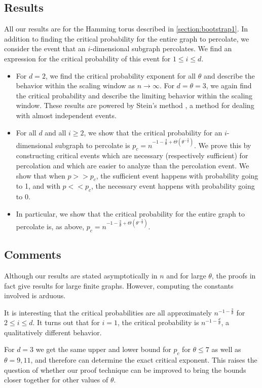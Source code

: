 \subsection{Results}
All our results are for the Hamming torus described in \ref{section:bootstrap1}. 
In addition to finding the critical probability for the entire graph to percolate, we consider the event that an $i$-dimensional subgraph percolates.
We find an expression for the critical probability of this event for $1 \le i \le d$.
\begin{itemize}
\item For $d=2$, we find the critical probability exponent for all $\theta$ and describe the behavior within the scaling window as $n \to \infty$.
For $d=\theta = 3$, we again find the critical probability and describe the limiting behavior within the scaling window.
These results are powered by Stein's method \cite{poissonbook}, a method for dealing with almost independent events.
\item For all $d$ and all $i \ge 2$, we show that the critical probability for an $i$-dimensional subgraph to percolate is $p_c = n^{-1-\frac{2}{\theta} + \Theta(\theta^{-\frac{3}{2}})}$.
We prove this by constructing critical events which are necessary (respectively sufficient) for percolation and which are easier to analyze than the percolation event.
We show that when $p >> p_c$, the sufficient event happens with probability going to 1, and with $p << p_c$, the necessary event happens with probability going to 0.
\item In particular, we show that the critical probability for the entire graph to percolate is, as above, $p_c = n^{-1-\frac{2}{\theta} + \Theta(\theta^{-\frac{3}{2}})}$.
\end{itemize}

\subsection{Comments}
Although our results are stated asymptotically in $n$ and for large $\theta$, the proofs in fact give results for large finite graphs.
However, computing the constants involved is arduous. 

It is interesting that the critical probabilities are all approximately $n^{-1-\frac{2}{\theta}}$ for $2 \le i \le d$.
It turns out that for $i=1$, the critical probability is $n^{-1-\frac{d}{\theta}}$, a qualitatively different behavior.

For $d = 3$ we get the same upper and lower bound for $p_c$ for $\theta \le 7$ as well as $\theta = 9, 11$, and therefore can determine the exact critical exponent.
This raises the question of whether our proof technique can be improved to bring the bounds closer together for other values of $\theta$.

